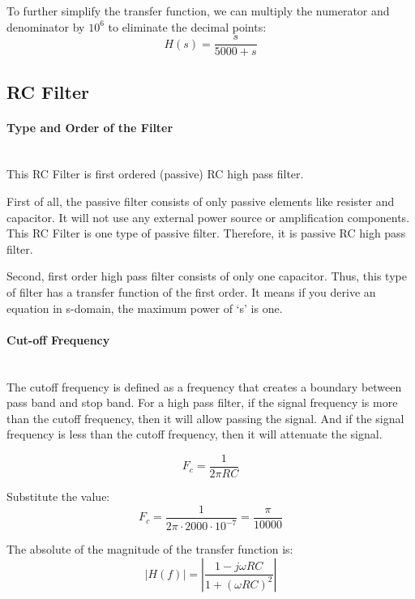 \documentclass[
	a4paper,
	11pt,
]{article}
\begin{document}
To further simplify the transfer function, we can multiply the numerator and denominator by \(10^6\) to eliminate the decimal points:
\begin{equation}
    H(s) = \frac{s}{5000 + s}
\end{equation}

\subsection{RC Filter}

\paragraph{Type and Order of the Filter}\mbox{}\\
This RC Filter is first ordered (passive) RC high pass filter.

First of all, the passive filter consists of only passive elements like resister and capacitor. It will not use any external power source or amplification components. This RC Filter is one type of passive filter. Therefore, it is passive RC high pass filter.

Second, first order high pass filter consists of only one capacitor. Thus, this type of filter has a transfer function of the first order. It means if you derive an equation in s-domain, the maximum power of ‘s’ is one. 

\paragraph{Cut-off Frequency}\mbox{}\\
The cutoff frequency is defined as a frequency that creates a boundary between pass band and stop band. For a high pass filter, if the signal frequency is more than the cutoff frequency, then it will allow passing the signal. And if the signal frequency is less than the cutoff frequency, then it will attenuate the signal.

\begin{equation}
    F_c = \frac{1}{2 \pi RC} 
\end{equation}

Substitute the value:
\begin{equation}
    F_c = \frac{1}{2 \pi \cdot 2000 \cdot 10^{-7}} = \frac{\pi}{10000} 
\end{equation}

The absolute of the magnitude of the transfer function is:
\begin{equation}
    \left| H(f) \right| = \left| \frac{1 - j \omega R C}{1 + (\omega R C)^2} \right| 
\end{equation}
\end{document}
